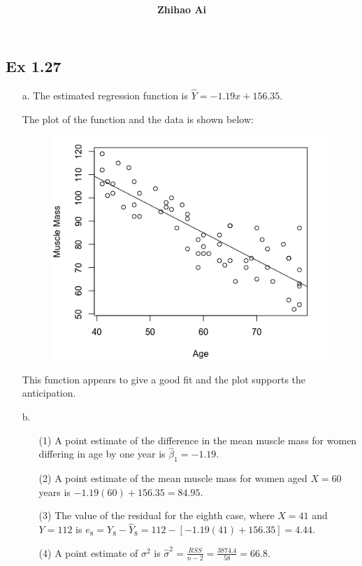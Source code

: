 \documentclass[10pt]{report}
\title{
	\vspace{2in}
	\textmd{\textbf{\hwCourse\\\hwTitle}}\\
	\vspace{0.3in}\large{\textit{\hmwkClassInstructor}}
	\vspace{3in}
}
\author{\textbf{Zhihao Ai}}
\date{}
\begin{document}
\maketitle

\subsection*{Ex 1.27}
\begin{enumerate}
	\item [a.]
	The estimated regression function is $\hat{Y} = -1.19x + 156.35$.
	
	The plot of the function and the data is shown below:
	\begin{figure}[H]
		\centering
		\includegraphics[width=.6\linewidth]{27a.png}
	\end{figure}
	This function appears to give a good fit and the plot supports the anticipation.
	
	\item [b.]
	\begin{enumerate}
		\item [(1)]
		A point estimate of the difference in the mean muscle mass for women differing in age by one year is $\hat{\beta}_1 = -1.19$.
		
		\item [(2)]
		A point estimate of the mean muscle mass for women aged $X=60$ years is $-1.19(60) + 156.35 = 84.95$.
		
		\item [(3)]
		The value of the residual for the eighth case, where $X=41$ and $Y=112$ is $e_8 = Y_8 - \hat{Y}_8 = 112 - [-1.19(41) + 156.35] = 4.44$.
		
		\item [(4)]
		A point estimate of $\sigma^2$ is $\hat{\sigma}^2 = \frac{RSS}{n-2} = \frac{3874.4}{58} = 66.8$.
		
	\end{enumerate}
\end{enumerate}
\end{document}
